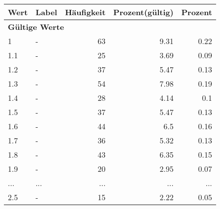      \begin{longtable}{lXrrr}
     \toprule
     \textbf{Wert} & \textbf{Label} & \textbf{Häufigkeit} & \textbf{Prozent(gültig)} & \textbf{Prozent} \\
     \endhead
     \midrule
     \multicolumn{5}{l}{\textbf{Gültige Werte}}\\
        1 & \multicolumn{1}{X}{-} & %
          \num{63} &
          \num[round-mode=places,round-precision=2]{9.31} &
          \num[round-mode=places,round-precision=2]{0.22} \\
        1.1 & \multicolumn{1}{X}{-} & %
          \num{25} &
          \num[round-mode=places,round-precision=2]{3.69} &
          \num[round-mode=places,round-precision=2]{0.09} \\
        1.2 & \multicolumn{1}{X}{-} & %
          \num{37} &
          \num[round-mode=places,round-precision=2]{5.47} &
          \num[round-mode=places,round-precision=2]{0.13} \\
        1.3 & \multicolumn{1}{X}{-} & %
          \num{54} &
          \num[round-mode=places,round-precision=2]{7.98} &
          \num[round-mode=places,round-precision=2]{0.19} \\
        1.4 & \multicolumn{1}{X}{-} & %
          \num{28} &
          \num[round-mode=places,round-precision=2]{4.14} &
          \num[round-mode=places,round-precision=2]{0.1} \\
        1.5 & \multicolumn{1}{X}{-} & %
          \num{37} &
          \num[round-mode=places,round-precision=2]{5.47} &
          \num[round-mode=places,round-precision=2]{0.13} \\
        1.6 & \multicolumn{1}{X}{-} & %
          \num{44} &
          \num[round-mode=places,round-precision=2]{6.5} &
          \num[round-mode=places,round-precision=2]{0.16} \\
        1.7 & \multicolumn{1}{X}{-} & %
          \num{36} &
          \num[round-mode=places,round-precision=2]{5.32} &
          \num[round-mode=places,round-precision=2]{0.13} \\
        1.8 & \multicolumn{1}{X}{-} & %
          \num{43} &
          \num[round-mode=places,round-precision=2]{6.35} &
          \num[round-mode=places,round-precision=2]{0.15} \\
        1.9 & \multicolumn{1}{X}{-} & %
          \num{20} &
          \num[round-mode=places,round-precision=2]{2.95} &
          \num[round-mode=places,round-precision=2]{0.07} \\
       ... & ... & ... & ... & ... \\
        2.5 & \multicolumn{1}{X}{-} & %
          \num{15} &
          \num[round-mode=places,round-precision=2]{2.22} &
          \num[round-mode=places,round-precision=2]{0.05} \\


\end{longtable}
